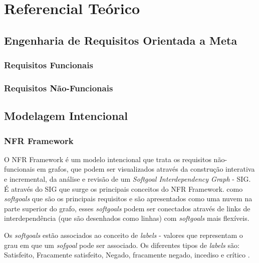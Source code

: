 \chapter[Referencial Teórico]{Referencial Teórico}

\section{Engenharia de Requisitos Orientada a Meta}



\subsection{Requisitos Funcionais}

\subsection{Requisitos Não-Funcionais}

\section{Modelagem Intencional}

\subsection{NFR Framework}

O NFR Framework é um modelo intencional que trata os requisitos não-funcionais em grafos, que podem ser visualizados através da construção interativa e incremental, da análise e revisão de um \textit{Softgoal Interdependency Graph} - SIG. É através do SIG que surge os principais conceitos do NFR Framework. como \textit{softgoals} que são os principais requisitos e são apresentados como uma nuvem na parte superior do grafo, esses \textit{softgoals} podem ser conectados através de links de interdependência (que são desenhados como linhas) com \textit{softgoals} mais flexíveis\cite{chung2012non}.

Os \textit{softgoals} estão associados ao conceito de \textit{labels} - valores que representam o grau em que um \textit{sofgoal} pode ser associado. Os diferentes tipos de \textit{labels} são: Satisfeito, Fracamente satisfeito, Negado, fracamente negado, incediso e crítico \cite{chung2012non}. 
